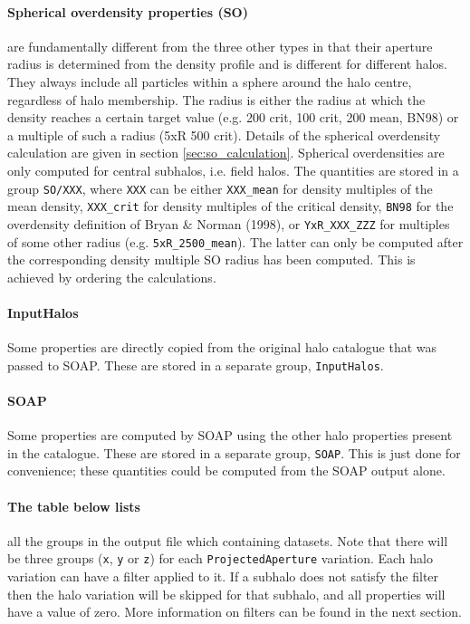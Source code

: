 \documentclass{article}
\begin{document}
\paragraph{Spherical overdensity properties (SO)} are fundamentally different from the three other types in 
that their aperture radius is determined from the density profile and is different for different halos. They 
always include all particles within a sphere around the halo centre, regardless of halo membership. 
The radius is either the radius at which the density reaches a certain target value (e.g.  200 
crit, 100 crit, 200 mean, BN98) or a multiple of such a radius (5xR 500 crit). Details 
of the spherical overdensity calculation are given in section \ref{sec:so_calculation}. Spherical overdensities are 
only computed for central subhalos, i.e. field halos. The quantities are stored in a group 
\verb+SO/XXX+, where \verb+XXX+ can be either \verb+XXX_mean+ for density multiples of the mean density, 
\verb+XXX_crit+ for density multiples of the critical density, \verb+BN98+ for the overdensity definition of 
Bryan \& Norman (1998), or \verb+YxR_XXX_ZZZ+ for multiples of some other radius (e.g. \verb+5xR_2500_mean+). 
The latter can only be computed after the corresponding density multiple SO radius has been computed. This is 
achieved by ordering the calculations.

\paragraph{InputHalos} Some properties are directly copied from the original halo catalogue that was passed
to SOAP. These are stored in a separate group, \verb+InputHalos+.

\paragraph{SOAP} Some properties are computed by SOAP using the other halo properties present in the catalogue.
These are stored in a separate group, \verb+SOAP+. This is just done for convenience; these quantities could be computed from the SOAP output alone.

\paragraph{The table below lists} all the groups in the output file which containing datasets.
Note that there will be three groups (\verb+x+, \verb+y+ or \verb+z+) for each \verb+ProjectedAperture+ variation.
Each halo variation can have a filter applied to it. If a subhalo does not satisfy the filter then the halo variation
will be skipped for that subhalo, and all properties will have a value of zero. More information on filters can be found in the next section.
\end{document}
